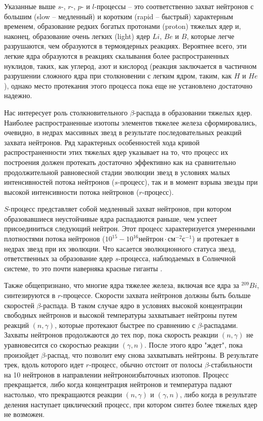 Указанные выше $s$-, $r$-, $p$- и $l$-процессы -- это соответственно захват нейтронов
с большим (slow -- медленный) и коротким (rapid -- быстрый) характерным временем, образование редких
богатых протонами (proton) тяжелых ядер и, наконец,
образование очень легких (light) ядер $Li$, $Be$ и $B$, которые легче разрушаются,
чем образуются в термоядерных реакциях. Вероятнее всего, эти легкие ядра
образуются в реакциях скалывания более распространенных нуклидов, таких, как углерод,
азот и кислород (реакция заключается в частичном разрушении сложного ядра при столкновении
с легким ядром, таким, как $H$ и $He$), однако место протекания этого
процесса пока еще не установлено достаточно надежно.

Нас интересует роль столкновительного $\beta$-распада в образовании тяжелых ядер.
Наиболее распространенные изотопы элементов тяжелее железа сформировались,
очевидно, в недрах массивных звезд  в результате последовательных реакций захвата нейтронов.
Ряд характерных особенностей хода кривой распространенности этих тяжелых ядер указывает на то,
что процесс их построения должен протекать достаточно эффективно как на сравнительно продолжительной
равновесной стадии эволюции звезд в условиях малых интенсивностей потока нейтронов ($s$-процесс),
так и в момент взрыва звезды при высокой интенсивности потока нейтронов ($r$-процесс).


$S$-процесс представляет собой медленный захват нейтронов, при котором образовавшиеся неустойчивые ядра распадаются
раньше, чем успеет присоединиться следующий нейтрон. Этот процесс характеризуется умеренными плотностями потока нейтронов
($10^{15} - 10^{16}  нейтрон\cdot см^{-2} с^{-1}$) и протекает в недрах звезд при их эволюции. Что касается эволюционного
статуса звезд, ответственных за образование ядер $s$-процесса, наблюдаемых в Солнечной системе, то это почти наверняка
красные гиганты \cite{iader}.

Также общепризнано, что многие ядра тяжелее железа, включая все ядра за $^{209}Bi$,
синтезируются в $r$-процессе. Скорости захвата нейтронов должны быть больше скоростей $\beta$-распада.
В таком случае ядро в условиях высокой концентрации свободных нейтронов и
высокой температуры захватывает нейтроны путем реакций $(n, \gamma)$, которые протекают
быстрее по сравнению с $\beta$-распадами. Захваты нейтронов продолжаются до тех пор,
пока скорость реакции $(n, \gamma)$ не уравновесится со скоростью реакции $(\gamma, n)$.
После этого ядро "ждет", пока произойдет $\beta$-распад, что позволит ему снова
захватывать нейтроны. В результате трек, вдоль которого идет $r$-процесс, обычно
отстоит от полосы $\beta$-стабильности на 10 нейтронов в направлении нейтроноизбыточных изотопов.
Процесс прекращается, либо когда концентрация нейтронов и температура падают
настолько, что прекращаются реакции $(n, \gamma)$ и $(\gamma, n)$, либо когда
в результате деления наступает циклический процесс, при котором синтез более тяжелых ядер не возможен.

